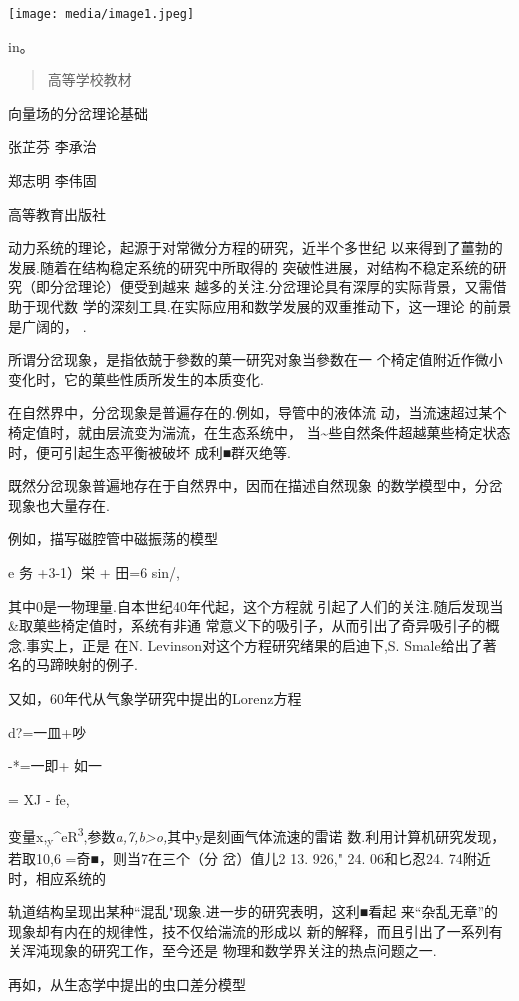 \documentclass{article}
\begin{document}
\texttt{[image: media/image1.jpeg]}


in。

\begin{quote}
高等学校教材
\end{quote}

向量场的分岔理论基础

张芷芬 李承治

郑志明 李伟固

高等教育出版社

动力系统的理论，起源于对常微分方程的研究，近半个多世纪
以来得到了薑勃的发展.随着在结构稳定系统的研究中所取得的
突破性进展，对结构不稳定系统的研究（即分岔理论）便受到越来
越多的关注.分岔理论具有深厚的实际背景，又需借助于现代数
学的深刻工具.在实际应用和数学发展的双重推动下，这一理论 的前景是广阔的，
.

所谓分岔现象，是指依兢于參数的菓一研究对象当參数在一
个椅定值附近作微小变化时，它的菓些性质所发生的本质变化.

在自然界中，分岔现象是普遍存在的.例如，导管中的液体流
动，当流速超过某个椅定值时，就由层流变为湍流，在生态系统中，
当\textasciitilde{}些自然条件超越菓些椅定状态时，便可引起生态平衡被破坏
成利■群灭绝等.

既然分岔现象普遍地存在于自然界中，因而在描述自然现象
的数学模型中，分岔现象也大量存在.

例如，描写磁腔管中磁振荡的模型

e 务 +3-1）栄 + 田=6 sin/,

其中0是一物理量.自本世纪40年代起，这个方程就
引起了人们的关注.随后发现当\&取菓些椅定值时，系统有非通
常意义下的吸引子，从而引出了奇异吸引子的概念.事实上，正是 在N.
Levinson对这个方程研究绪果的启迪下,S. Smale给出了著 名的马蹄映射的例子.

又如，60年代从气象学研究中提出的Lorenz方程

d?=一皿+吵

-*=一即+ 如一

= XJ - fe,

变量x,\textsubscript{y}\^{}eR\textsuperscript{3},参数\emph{a,7,b\textgreater{}o,}其中y是刻画气体流速的雷诺
数.利用计算机研究发现，若取10,6 =奇■，则当7在三个（分 岔）值儿2 13.
926," 24. 06和匕忍24. 74附近时，相应系统的

轨道结构呈现出某种``混乱"现象.进一步的研究表明，这利■看起
来``杂乱无章''的现象却有内在的规律性，技不仅给湍流的形成以
新的解释，而且引出了一系列有关浑沌现象的研究工作，至今还是
物理和数学界关注的热点问题之一.

再如，从生态学中提出的虫口差分模型
\end{document}
